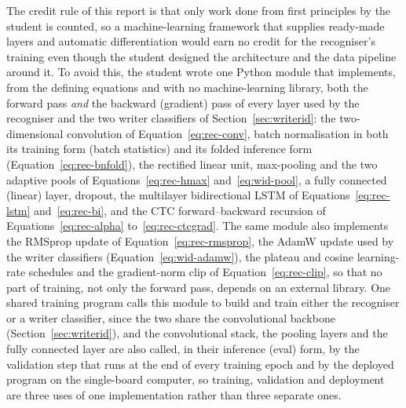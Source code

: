 The credit rule of this report is that only work done from first principles by the student is counted, so a machine-learning framework that supplies ready-made layers and automatic differentiation would earn no credit for the recogniser's training even though the student designed the architecture and the data pipeline around it.
To avoid this, the student wrote one Python module that implements, from the defining equations and with no machine-learning library, both the forward pass \emph{and} the backward (gradient) pass of every layer used by the recogniser and the two writer classifiers of Section~\ref{sec:writerid}: the two-dimensional convolution of Equation~\ref{eq:rec-conv}, batch normalisation in both its training form (batch statistics) and its folded inference form (Equation~\ref{eq:rec-bnfold}), the rectified linear unit, max-pooling and the two adaptive pools of Equations~\ref{eq:rec-hmax} and~\ref{eq:wid-pool}, a fully connected (linear) layer, dropout, the multilayer bidirectional LSTM of Equations~\ref{eq:rec-lstm} and~\ref{eq:rec-bi}, and the CTC forward--backward recursion of Equations~\ref{eq:rec-alpha} to~\ref{eq:rec-ctcgrad}.
The same module also implements the RMSprop update of Equation~\ref{eq:rec-rmsprop}, the AdamW update used by the writer classifiers (Equation~\ref{eq:wid-adamw}), the plateau and cosine learning-rate schedules and the gradient-norm clip of Equation~\ref{eq:rec-clip}, so that no part of training, not only the forward pass, depends on an external library.
One shared training program calls this module to build and train either the recogniser or a writer classifier, since the two share the convolutional backbone (Section~\ref{sec:writerid}), and the convolutional stack, the pooling layers and the fully connected layer are also called, in their inference (eval) form, by the validation step that runs at the end of every training epoch and by the deployed program on the single-board computer, so training, validation and deployment are three uses of one implementation rather than three separate ones.

